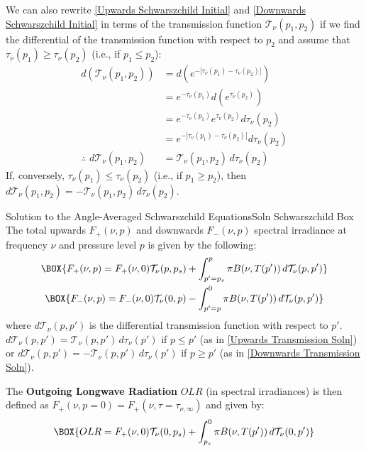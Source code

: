 We can also rewrite \ref{Upwards Schwarszchild Initial} and \ref{Downwards Schwarszchild Initial} in terms of the transmission function $\mathcal{T}_\nu(p_1,p_2)$ if we find the differential of the transmission function with respect to $p_2$ and assume that $\tau_\nu(p_1)\geq\tau_\nu(p_2)$ (i.e., if $p_1\leq p_2$):
\begin{align*}
    d\left( \mathcal{T}_\nu(p_1,p_2) \right)&=d\left( e^{-|\tau_\nu(p_1)-\tau_\nu(p_2)|} \right)\\
    &=e^{-\tau_\nu(p_1)} d\left(e^{\tau_\nu(p_2)} \right)\\
    &= e^{-\tau_\nu(p_1)}e^{\tau_\nu(p_2)}d\tau_\nu(p_2) \\
    &=e^{-|\tau_\nu(p_1)-\tau_\nu(p_2)|}d\tau_\nu(p_2)\\
    \therefore\,\,d\mathcal{T}_\nu(p_1,p_2)&=\mathcal{T}_\nu(p_1,p_2)\,d\tau_\nu(p_2)
\end{align*}
If, conversely, $\tau_\nu(p_1)\leq\tau_\nu(p_2)$ (i.e., if $p_1\geq p_2$), then $d\mathcal{T}_\nu(p_1,p_2)=-\mathcal{T}_\nu(p_1,p_2)\,d\tau_\nu(p_2)$.

\begin{fact}{Solution to the Angle-Averaged Schwarszchild Equations}{Soln Schwarszchild Box}\label{Soln Schwarszchild Box}
    The total upwards $F_+(\nu,p)$ and downwards $F_-(\nu,p)$ spectral irradiance at frequency $\nu$ and pressure level $p$ is given by the following:
    \begin{gather}
        \label{Upwards Transmission Soln}
        \BOX{F_+(\nu,p)
        =
        F_+(\nu,0)\mathcal{T}_\nu(p,p_s)
        +
        \int_{p'=p_s}^{p}\pi B(\nu,T(p'))\,d\mathcal{T}_\nu(p,p')} 
        \\ 
        \label{Downwards Transmission Soln}
        \BOX{F_-(\nu,p)
        =
        F_-(\nu,0)\mathcal{T}_\nu(0,p)
        -
        \int_{p'=p}^{0}\pi B(\nu,T(p'))\,d\mathcal{T}_\nu(p,p') }
    \end{gather}
    where $d\mathcal{T}_\nu(p,p')$ is the differential transmission function with respect to $p'$. $d\mathcal{T}_\nu(p,p')=\mathcal{T}_\nu(p,p')\,d\tau_\nu(p')$ if $p\leq p'$ (as in \ref{Upwards Transmission Soln}) or $d\mathcal{T}_\nu(p,p')=-\mathcal{T}_\nu(p,p')\,d\tau_\nu(p')$ if $p\geq p'$ (as in \ref{Downwards Transmission Soln}).

    The \textbf{Outgoing Longwave Radiation} $OLR$ (in spectral irradiances) is then defined as $F_+(\nu,p=0)=F_+(\nu,\tau=\tau_{\nu,\infty})$ and given by:
    \begin{align}
        \BOX{OLR=
        F_+(\nu,0)\mathcal{T}_\nu(0,p_s)
        +
        \int_{p_s}^{0}\pi B(\nu,T(p'))\,d\mathcal{T}_\nu(0,p') }\label{OLR Transmission Soln}
    \end{align} 
\end{fact}

